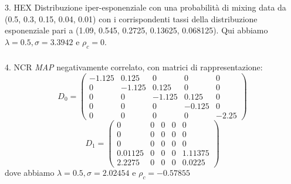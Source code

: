 \documentclass{beamer}
\begin{document}
\begin{frame}
    \frametitle{}
    \begin{block}{3. HEX}
        Distribuzione iper-esponenziale con una probabilità di mixing data da (0.5, 0.3, 0.15, 0.04, 0.01) con i corrispondenti tassi della distribuzione esponenziale pari a (1.09, 0.545, 0.2725, 0.13625, 0.068125). Qui abbiamo $\lambda = 0.5, \sigma = 3.3942$ e $\rho_c = 0$.
    \end{block}
\end{frame}


\begin{frame}
    \frametitle{}
    \begin{block}{4. NCR}
        \emph{MAP} negativamente correlato, con matrici di rappresentazione:
        \begin{equation*}
            D_0 =
            \begin{pmatrix}
                -1.125 & 0.125 & 0 & 0 & 0 \\
                0 & -1.125 & 0.125 & 0 & 0 \\
                0 & 0 & -1.125 & 0.125 & 0 \\
                0 & 0 & 0 & -0.125 & 0 \\
                0 & 0 & 0 & 0 & -2.25
            \end{pmatrix}
        \end{equation*}
        \begin{equation*}
            D_1 =
            \begin{pmatrix}
                0 & 0 & 0 & 0 & 0 \\
                0 & 0 & 0 & 0 & 0 \\
                0 & 0 & 0 & 0 & 0 \\
                0.01125 & 0 & 0 & 0 & 1.11375 \\
                2.2275 & 0 & 0 & 0 & 0.0225
            \end{pmatrix}
        \end{equation*}
        dove abbiamo $\lambda = 0.5, \sigma = 2.02454$ e $\rho_c =  -0.57855$
    \end{block}
\end{frame}
\end{document}
